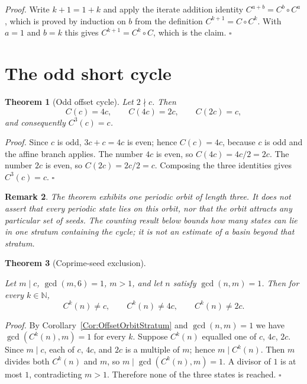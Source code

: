 \documentclass[11pt,letterpaper]{article}
\newcommand{\N}{\mathbb{N}}
\newtheorem{theorem}{Theorem}
\newtheorem{remark}[theorem]{Remark}
\newenvironment{proof}{\noindent\textit{Proof.}}{\hfill\(\square\)}
\begin{document}
\begin{proof}
Write $k+1=1+k$ and apply the iterate addition identity
$C^{a+b}=C^{b}\circ C^{a}$, which is proved by induction on $b$ from the
definition $C^{k+1}=C\circ C^{k}$. With $a=1$ and $b=k$ this gives
$C^{k+1}=C^{k}\circ C$, which is the claim.
\end{proof}

\section{The odd short cycle}

\begin{theorem}[Odd offset cycle]\label{Thm:OffsetCycle}
Let $2\nmid c$. Then
\[
 C(c)=4c,\qquad C(4c)=2c,\qquad C(2c)=c,
\]
and consequently $C^{3}(c)=c$.
\end{theorem}

\begin{proof}
Since $c$ is odd, $3c+c=4c$ is even; hence $C(c)=4c$, because $c$ is odd and
the affine branch applies. The number $4c$ is even, so $C(4c)=4c/2=2c$. The
number $2c$ is even, so $C(2c)=2c/2=c$. Composing the three identities gives
$C^{3}(c)=c$.
\end{proof}

\begin{remark}\label{Rem:OffsetCycleScope}
The theorem exhibits one periodic orbit of length three. It does not assert
that every periodic state lies on this orbit, nor that the orbit attracts any
particular set of seeds. The counting result below bounds how many states can
lie in one stratum containing the cycle; it is not an estimate of a basin
beyond that stratum.
\end{remark}

\begin{theorem}[Coprime-seed exclusion]\label{Thm:OffsetCoprimeSeedAvoidsCycle}
\leavevmode\par
Let $m\mid c$, $\gcd(m,6)=1$, $m>1$, and let $n$ satisfy $\gcd(n,m)=1$. Then
for every $k\in\N$,
\[
 C^{k}(n)\ne c,\qquad C^{k}(n)\ne 4c,\qquad C^{k}(n)\ne 2c.
\]
\end{theorem}

\begin{proof}
By Corollary~\ref{Cor:OffsetOrbitStratum} and $\gcd(n,m)=1$ we have
$\gcd(C^{k}(n),m)=1$ for every $k$. Suppose $C^{k}(n)$ equalled one of $c$,
$4c$, $2c$. Since $m\mid c$, each of $c$, $4c$, and $2c$ is a multiple of
$m$; hence $m\mid C^{k}(n)$. Then $m$ divides both $C^{k}(n)$ and $m$, so
$m\mid\gcd(C^{k}(n),m)=1$. A divisor of $1$ is at most $1$, contradicting
$m>1$. Therefore none of the three states is reached.
\end{proof}
\end{document}
